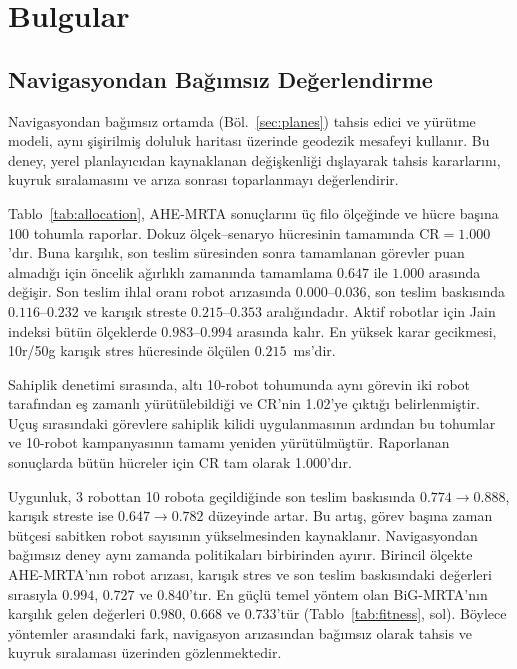 \documentclass[10pt,letterpaper,onecolumn]{IEEEtran}
\begin{document}
\section{Bulgular}
\label{sec:results}

\subsection{Navigasyondan Bağımsız Değerlendirme}
\label{sec:results-sim}

Navigasyondan bağımsız ortamda (Böl.~\ref{sec:planes}) tahsis edici ve yürütme
modeli, aynı şişirilmiş doluluk haritası üzerinde geodezik mesafeyi kullanır.
Bu deney, yerel planlayıcıdan kaynaklanan değişkenliği dışlayarak tahsis
kararlarını, kuyruk sıralamasını ve arıza sonrası toparlanmayı değerlendirir.



Tablo~\ref{tab:allocation}, AHE-MRTA sonuçlarını üç filo ölçeğinde ve hücre
başına 100 tohumla raporlar. Dokuz ölçek--senaryo hücresinin tamamında
CR${=}1.000$'dır. Buna karşılık, son teslim süresinden sonra tamamlanan görevler
puan almadığı için öncelik ağırlıklı zamanında tamamlama $0.647$ ile $1.000$
arasında değişir. Son teslim ihlal oranı robot arızasında $0.000$--$0.036$,
son teslim baskısında $0.116$--$0.232$ ve karışık streste $0.215$--$0.353$
aralığındadır. Aktif robotlar için Jain indeksi bütün ölçeklerde
$0.983$--$0.994$ arasında kalır. En yüksek karar gecikmesi, 10r/50g karışık
stres hücresinde ölçülen $0.215$~ms'dir.

Sahiplik denetimi sırasında, altı 10-robot tohumunda aynı görevin iki robot
tarafından eş zamanlı yürütülebildiği ve CR'nin 1.02'ye çıktığı belirlenmiştir.
Uçuş sırasındaki görevlere sahiplik kilidi uygulanmasının ardından bu tohumlar
ve 10-robot kampanyasının tamamı yeniden yürütülmüştür. Raporlanan sonuçlarda
bütün hücreler için CR tam olarak 1.000'dır.

Uygunluk, 3 robottan 10 robota geçildiğinde son teslim baskısında
$0.774\to0.888$, karışık streste ise $0.647\to0.782$ düzeyinde artar. Bu artış,
görev başına zaman bütçesi sabitken robot sayısının yükselmesinden kaynaklanır.
Navigasyondan bağımsız deney aynı zamanda politikaları birbirinden ayırır.
Birincil ölçekte AHE-MRTA'nın robot arızası, karışık stres ve son teslim
baskısındaki değerleri sırasıyla $0.994$, $0.727$ ve $0.840$'tır. En güçlü
temel yöntem olan BiG-MRTA'nın karşılık gelen değerleri $0.980$, $0.668$ ve
$0.733$'tür (Tablo~\ref{tab:fitness}, sol). Böylece yöntemler arasındaki fark,
navigasyon arızasından bağımsız olarak tahsis ve kuyruk sıralaması üzerinden
gözlenmektedir.
\end{document}
